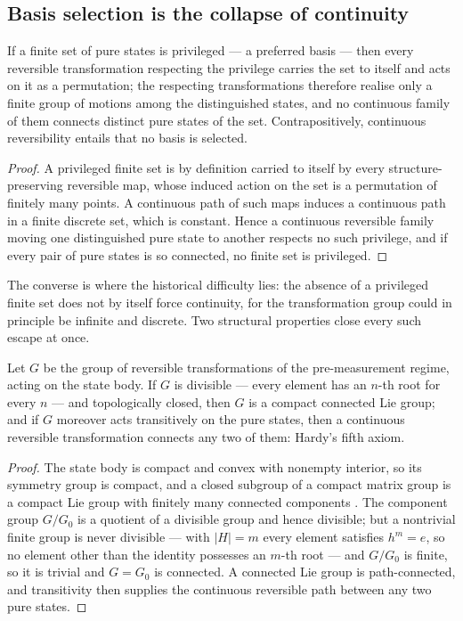 \subsection{Basis selection is the collapse of continuity}

\begin{proposition}\label{prop:basis-discreteness}
If a finite set of pure states is privileged --- a preferred basis --- then every reversible
transformation respecting the privilege carries the set to itself and acts on it as a permutation;
the respecting transformations therefore realise only a finite group of motions among the
distinguished states, and no continuous family of them connects distinct pure states of the set.
Contrapositively, continuous reversibility entails that no basis is selected.
\end{proposition}

\begin{proof}
A privileged finite set is by definition carried to itself by every structure-preserving reversible
map, whose induced action on the set is a permutation of finitely many points. A continuous path of
such maps induces a continuous path in a finite discrete set, which is constant. Hence a continuous
reversible family moving one distinguished pure state to another respects no such privilege, and if
every pair of pure states is so connected, no finite set is privileged.
\end{proof}

The converse is where the historical difficulty lies: the absence of a privileged finite set does
not by itself force continuity, for the transformation group could in principle be infinite and
discrete. Two structural properties close every such escape at once.

\begin{proposition}\label{prop:divisible-closed}
Let $G$ be the group of reversible transformations of the pre-measurement regime, acting on the
state body. If $G$ is divisible --- every element has an $n$-th root for every $n$ --- and
topologically closed, then $G$ is a compact connected Lie group; and if $G$ moreover acts
transitively on the pure states, then a continuous reversible transformation connects any two of
them: Hardy's fifth axiom.
\end{proposition}

\begin{proof}
The state body is compact and convex with nonempty interior, so its symmetry group is compact, and
a closed subgroup of a compact matrix group is a compact Lie group with finitely many connected
components \autocite{broeckertomdieck1985compact}. The component group $G/G_{0}$ is a quotient of a
divisible group and hence divisible; but a nontrivial finite group is never divisible --- with
$\lvert H\rvert = m$ every element satisfies $h^{m} = e$, so no element other than the identity
possesses an $m$-th root --- and $G/G_{0}$ is finite, so it is trivial and $G = G_{0}$ is connected.
A connected Lie group is path-connected, and transitivity then supplies the continuous reversible
path between any two pure states.
\end{proof}

